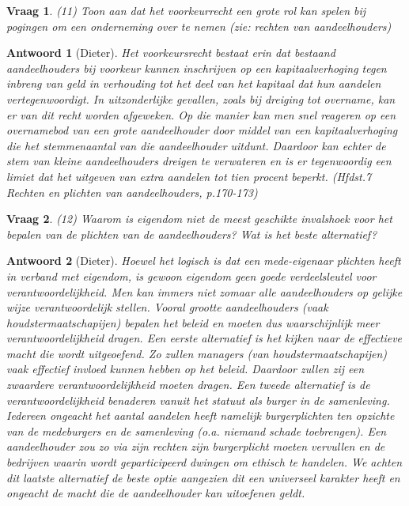 \documentclass{article}
\theoremstyle{nonumberplain}
\newtheorem{question}{Vraag}
\newtheorem{answer}{Antwoord}
\begin{document}
\begin{question}
(11)	Toon aan dat het voorkeurrecht een grote rol kan spelen bij pogingen om een onderneming over te nemen (zie: rechten van aandeelhouders)
\end{question}
\begin{answer}[Dieter]
	Het voorkeursrecht bestaat erin dat bestaand aandeelhouders bij voorkeur kunnen inschrijven op een kapitaalverhoging tegen inbreng van geld in verhouding tot het deel van het kapitaal dat hun aandelen vertegenwoordigt.
	In uitzonderlijke gevallen, zoals bij dreiging tot overname, kan er van dit recht worden afgeweken.
	Op die manier kan men snel reageren op een overnamebod van een grote aandeelhouder door middel van een kapitaalverhoging die het stemmenaantal van die aandeelhouder uitdunt.
	Daardoor kan echter de stem van kleine aandeelhouders dreigen te verwateren en is er tegenwoordig een limiet dat het uitgeven van extra aandelen tot tien procent beperkt.
	\textit{(Hfdst.7 Rechten en plichten van aandeelhouders, p.170-173)}
\end{answer}

\begin{question}
(12)	Waarom is eigendom niet de meest geschikte invalshoek voor het bepalen van de plichten van de aandeelhouders? Wat is het beste alternatief?
\end{question}
\begin{answer}[Dieter]
	Hoewel het logisch is dat een mede-eigenaar plichten heeft in verband met eigendom, is gewoon eigendom geen goede verdeelsleutel voor verantwoordelijkheid.
	Men kan immers niet zomaar alle aandeelhouders op gelijke wijze verantwoordelijk stellen.
	Vooral grootte aandeelhouders (vaak houdstermaatschapijen) bepalen het beleid en moeten dus waarschijnlijk meer verantwoordelijkheid dragen.
	Een eerste alternatief is het kijken naar de effectieve macht die wordt uitgeoefend.
	Zo zullen managers (van houdstermaatschapijen) vaak effectief invloed kunnen hebben op het beleid.
	Daardoor zullen zij een zwaardere verantwoordelijkheid moeten dragen.
	Een tweede alternatief is de verantwoordelijkheid benaderen vanuit het statuut als burger in de samenleving. Iedereen ongeacht het aantal aandelen heeft namelijk burgerplichten ten opzichte van de medeburgers en de samenleving (o.a. niemand schade toebrengen).
	Een aandeelhouder zou zo via zijn rechten zijn burgerplicht moeten vervullen en de bedrijven waarin wordt geparticipeerd dwingen om ethisch te handelen.
	We achten dit laatste alternatief de beste optie aangezien dit een universeel karakter heeft en ongeacht de macht die de aandeelhouder kan uitoefenen geldt.
\end{answer}
\end{document}
